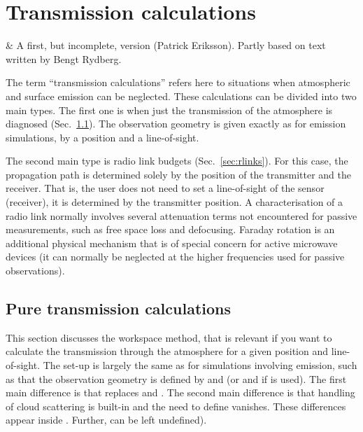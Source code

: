 \chapter{Transmission calculations}
 \label{sec:trans}

 & A first, but incomplete, version (Patrick Eriksson). Partly based on
 text written by Bengt Rydberg.\\
\stophistory

\graphicspath{{Figs/transmission/}}

The term ``transmission calculations'' refers here to situations when
atmospheric and surface emission can be neglected. These calculations can be
divided into two main types. The first one is when just the transmission of the
atmosphere is diagnosed (Sec.~\ref{sec:transmission}). The observation geometry
is given exactly as for emission simulations, by a position and a
line-of-sight.

The second main type is radio link budgets (Sec.~\ref{sec:rlinks}). For
this case, the propagation path is determined solely by the position of the
transmitter and the receiver. That is, the user does not need to set a
line-of-sight of the sensor (receiver), it is determined by the transmitter
position. A characterisation of a radio link normally involves several
attenuation terms not encountered for passive measurements, such as free space
loss and defocusing. Faraday rotation is an additional physical mechanism that
is of special concern for active microwave devices (it can normally be
neglected at the higher frequencies used for passive observations).




\section{Pure transmission calculations}
\label{sec:transmission}

This section discusses the  workspace method,
that is relevant if you want to calculate the transmission through the
atmosphere for a given position and line-of-sight. The set-up is largely the
same as for simulations involving emission, such as that the observation
geometry is defined by  and  (or
 and  if  is used).
The first main difference is that  replaces
 and . The second
main difference is that handling of cloud scattering is built-in and the need
to define  vanishes. These differences appear
inside . Further,
 can be left undefined).

